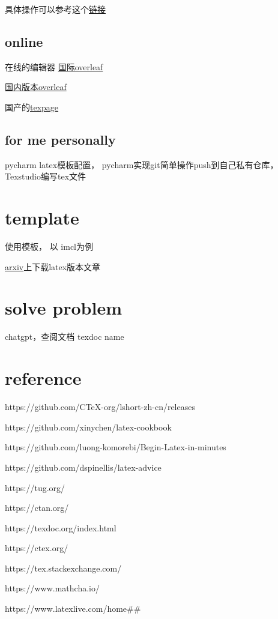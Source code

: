 \documentclass[11pt]{ctexart}
\begin{document}
具体操作可以参考这个\href{https://zhuanlan.zhihu.com/p/60996450}{链接}
 

 
 \subsection{online}
 
 在线的编辑器 \href{www.overleaf.com}{国际overleaf}
 
 \href{cn.overleaf.com}{国内版本overleaf}
 
 国产的\href{www.texpage.com}{texpage}
 
 
 \subsection{for me personally}
 
 pycharm latex模板配置， pycharm实现git简单操作push到自己私有仓库，Texstudio编写tex文件
 
 \section{template}

使用模板， 以 imcl为例

\href{https://arxiv.org/}{arxiv}上下载latex版本文章
\section{solve problem}

 chatgpt，查阅文档  texdoc name





\section{reference}

https://github.com/CTeX-org/lshort-zh-cn/releases

https://github.com/xinychen/latex-cookbook

https://github.com/luong-komorebi/Begin-Latex-in-minutes

https://github.com/dspinellis/latex-advice

https://tug.org/

https://ctan.org/

https://texdoc.org/index.html

https://ctex.org/

https://tex.stackexchange.com/

https://www.mathcha.io/

https://www.latexlive.com/home\#\#



\end{document}
